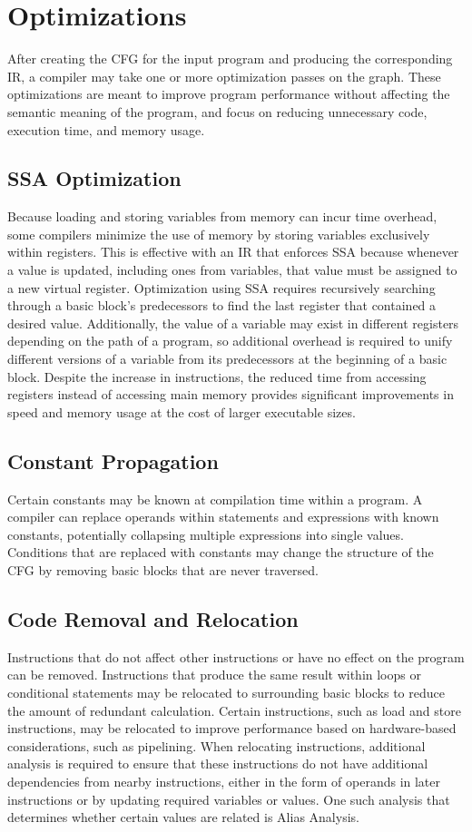 \section{Optimizations}
After creating the CFG for the input program and producing the corresponding IR, a compiler may take one or more optimization passes on the graph. These optimizations are meant to improve program performance without affecting the semantic meaning of the program, and focus on reducing unnecessary code, execution time, and memory usage.

\subsection{SSA Optimization}
Because loading and storing variables from memory can incur time overhead, some compilers minimize the use of memory by storing variables exclusively within registers. This is effective with an IR that enforces SSA because whenever a value is updated, including ones from variables, that value must be assigned to a new virtual register. Optimization using SSA requires recursively searching through a basic block's predecessors to find the last register that contained a desired value. Additionally, the value of a variable may exist in different registers depending on the path of a program, so additional overhead is required to unify different versions of a variable from its predecessors at the beginning of a basic block. Despite the increase in instructions, the reduced time from accessing registers instead of accessing main memory provides significant improvements in speed and memory usage at the cost of larger executable sizes.

\subsection{Constant Propagation}
Certain constants may be known at compilation time within a program. A compiler can replace operands within statements and expressions with known constants, potentially collapsing multiple expressions into single values. Conditions that are replaced with constants may change the structure of the CFG by removing basic blocks that are never traversed.

\subsection{Code Removal and Relocation}
Instructions that do not affect other instructions or have no effect on the program can be removed. Instructions that produce the same result within loops or conditional statements may be relocated to surrounding basic blocks to reduce the amount of redundant calculation. Certain instructions, such as load and store instructions, may be relocated to improve performance based on hardware-based considerations, such as pipelining. When relocating instructions, additional analysis is required to ensure that these instructions do not have additional dependencies from nearby instructions, either in the form of operands in later instructions or by updating required variables or values. One such analysis that determines whether certain values are related is Alias Analysis.

